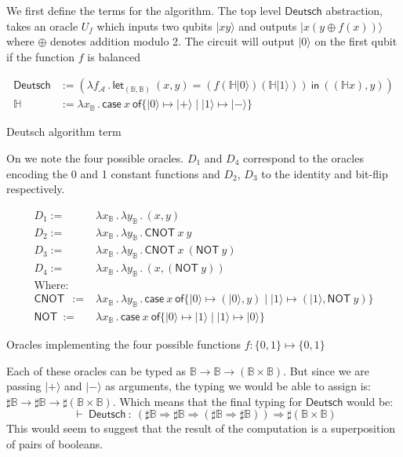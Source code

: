 \documentclass[runningheads,orivec,envcountsame,envcountsect]{llncs}
\newcommand\ket[1]{\ensuremath{|#1\rangle}}
\newcommand\AbsBasis{\ensuremath{\mathcal{A}}}
\def\Pair#1#2{(#1,#2)} %
\def\Lam#1#2#3{\lambda#1_{#2}\,{.}\,#3} %
\def\letkeyword{\mathsf{let}}
\def\inkeyword{\mathsf{in}}
\def\LetP#1#2#3#4#5#6{\letkeyword_{\Pair{#2}{#4}}~\Pair{#1}{#3}=#5~\inkeyword~#6}
\def\case#1#2#3#4#5{\ensuremath{\mathsf{case}~#1~\mathsf{of} \{#2\mapsto #4 \mid #3\mapsto #5\}}}
\def\Arr{\Rightarrow}
\def\TYP#1#2#3{#1~{\vdash}~#2~{:}~#3}
\newcommand\B{\mathbb B}
\newcommand\Hd{\mathbb{H}}
\newcommand{\cnot}[2]{\mathsf{CNOT}\ #1\ #2}
\newcommand{\pauliX}[1]{\mathsf{NOT}\ #1}
\begin{document}
We first define the terms for the algorithm. The top level $\mathsf{Deutsch}$ abstraction, takes an oracle $U_f$  which inputs two qubits $\ket{x y}$ and outputs $\ket{x (y\oplus f(x))}$ where $\oplus$ denotes addition modulo 2. The circuit will output $\ket{0}$ on the first qubit if the function $f$ is balanced 
\begin{table*}
    \small
    \begin{align*}
        \mathsf{Deutsch} &:= 
        (\Lam{{f}}{\AbsBasis}{
                \LetP{x}{\B}{y}{\B}
                {(f (\Hd \ket{0}) (\Hd \ket{1}))}
                {\Pair{(\Hd x)}{y}}
        })\\
        \Hd &:= \Lam{x}{\B}{\case{x}{\ket{0}}{\ket{1}}{\ket{+}}{\ket{-}}}
    \end{align*}
    \caption{Deutsch algorithm term}
\end{table*}

On  we note the four possible oracles. $D_1$ and $D_4$ correspond to the oracles encoding the 0 and 1 constant functions and $D_2$, $D_3$ to the identity and bit-flip respectively.

\begin{table*}
    \scriptsize
    \begin{align*}
        D_1 :=& \Lam{x}{\B}{\Lam{y}{\B}{\Pair{x}{y}}}\\
        D_2 :=& \Lam{x}{\B}{\Lam{y}{\B}{\cnot{x}{y}}}\\
        D_3 :=& \Lam{x}{\B}{\Lam{y}{\B}{\cnot{x}{(\pauliX{y})}}}\\
        D_4 :=& \Lam{x}{\B}{\Lam{y}{\B}{\Pair{x}{(\pauliX{y})}}}\\
        \text{Where:} &\\
        \cnot{}{} :=& \Lam{x}{\B}{\Lam{y}{\B}{
        \case{x}
        {\ket{0}}{\ket{1}}
        {\Pair{\ket{0}}{y}}{\Pair{\ket{1}}{\pauliX{y}}}}}\\
        \pauliX{} :=& \Lam{x}{\B}{\case{x}{\ket{0}}{\ket{1}}{\ket{1}}{\ket{0}}}
    \end{align*}
    
    \caption{Oracles implementing the four possible functions $f:\{0,1\}\mapsto\{0,1\}$}
    \label{tab:Oracles}
\end{table*}

Each of these oracles can be typed as $\B\to\B\to(\B\times\B)$. But since we are passing $\ket{+}$ and $\ket{-}$ as arguments, the typing we would be able to assign is: $\sharp\B\to\sharp\B\to\sharp(\B\times\B)$. Which means that the final typing for $\mathsf{Deutsch}$ would be:
\[
\TYP{}{\mathsf{Deutsch}}{(\sharp\B\Arr\sharp\B\Arr(\sharp\B\Arr\sharp\B))\Arr\sharp(\B\times\B)}
\]
This would seem to suggest that the result of the computation is a superposition of pairs of booleans.
\end{document}
